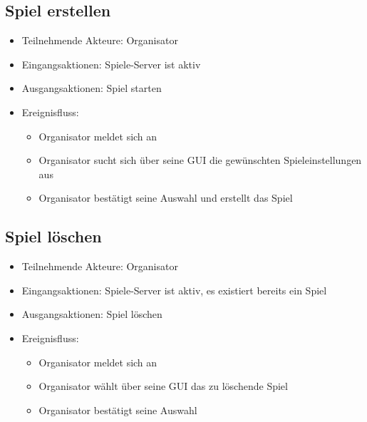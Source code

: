 \documentclass[a4paper]{scrreprt}
\begin{document}
    \subsection{Spiel erstellen}
    \begin{itemize}
        \item Teilnehmende Akteure: \Gls{Organisator}
        \item Eingangsaktionen: Spiele-Server ist aktiv
        \item Ausgangsaktionen: Spiel starten
        \item Ereignisfluss:
        \begin{itemize}
            \item Organisator meldet sich an
            \item Organisator sucht sich über seine GUI die gewünschten Spieleinstellungen aus
            \item Organisator bestätigt seine Auswahl und erstellt das Spiel
        \end{itemize}
    \end{itemize}

    \subsection{Spiel löschen}
    \begin{itemize}
        \item Teilnehmende Akteure: \Gls{Organisator}
        \item Eingangsaktionen: Spiele-Server ist aktiv, es existiert bereits ein Spiel
        \item Ausgangsaktionen: Spiel löschen
        \item Ereignisfluss:
        \begin{itemize}
            \item Organisator meldet sich an
            \item Organisator wählt über seine GUI das zu löschende Spiel
            \item Organisator bestätigt seine Auswahl
        \end{itemize}
    \end{itemize}
\end{document}
